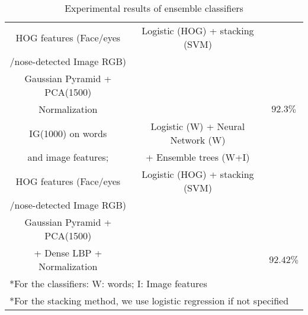 \begin{table}[h!]
\begin{tabular}{ c c c}
HOG features (Face/eyes & Logistic (HOG) + stacking (SVM) &\\
/nose-detected Image RGB) & &  \\ 
Gaussian Pyramid + PCA(1500) & & \\
Normalization & & $92.3\%$  \\ \hline
IG(1000) on words & Logistic (W) + Neural Network (W) & \\ 
and image features; & + Ensemble trees (W+I) & \\
HOG features (Face/eyes & Logistic (HOG) + stacking (SVM) &\\
/nose-detected Image RGB) & &  \\ 
Gaussian Pyramid + PCA(1500) & & \\
+ Dense LBP + Normalization & & $92.42\%$  \\ \hline
\multicolumn{3}{l}{*For the classifiers: W: words; I: Image features} \\
\multicolumn{3}{l}{*For the stacking method, we use logistic regression if not specified} \\
\hline
\end{tabular}
\caption{Experimental results of ensemble classifiers}
\label{Table 2}
\end{table}


